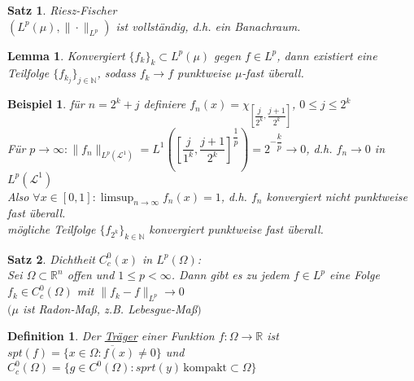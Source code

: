\documentclass[11pt]{memoir}
\theoremstyle{changebreak}
\newtheorem{Definition}{Definition}[chapter]
\newtheorem{Beispiel}{Beispiel}[chapter]
\newtheorem{Lemma}{Lemma}[chapter]
\newtheorem{Satz}{Satz}[chapter]
\begin{document}




\begin{Satz}
\emph{Riesz-Fischer} \\
$\left(L^p(\mu), \|\cdotp\|_{L^p}\right)$ ist vollständig, d.h. ein Banachraum.
\end{Satz}

\begin{Lemma}
Konvergiert $\{f_k\}_k \subset L^p (\mu)$ gegen $f \in L^p$, dann existiert eine Teilfolge $\{f_{k_j}\}_{j \in \mathbb N}$, sodass $f_k \rightarrow f$ punktweise $\mu$-fast überall.
\end{Lemma}

\begin{Beispiel}
für $n = 2^k + j$ definiere $f_n(x) = \chi_{\left[\dfrac{j}{2^k}, \dfrac{j+1}{2^k}\right]}$, $0 \leq j \leq 2^k$ \\
Für $p \rightarrow \infty: \|f_n\|_{L^p(\mathscr L^1)} = L^1\left(\left[\dfrac{j}{1^k}, \dfrac{j+1}{2^k} \right] ^{\dfrac{1}{p}} \right) = 2^{-\dfrac{k}{p}} \rightarrow 0$, d.h. $f_n \rightarrow 0$ in $L^p(\mathscr L^1)$ \\
Also $\forall x \in [0, 1]: \limsup_{n \rightarrow \infty} f_n (x) = 1$, d.h. $f_n$ konvergiert nicht punktweise fast überall. \\
mögliche Teilfolge $\{f_{2^k}\}_{k \in \mathbb N}$ konvergiert punktweise fast überall.
\end{Beispiel}

\begin{Satz}
\emph{Dichtheit $C^0_c (x)$ in $L^p(\Omega)$}: \\
Sei $\Omega \subset \mathbb R^n$ offen und $1 \leq p < \infty$. Dann gibt es zu jedem $f \in L^p$ eine Folge $f_k \in C^0_c (\Omega)$ mit $\|f_k - f\|_{L^p} \rightarrow 0$\\
$(\mu$ ist Radon-Maß, z.B. Lebesgue-Maß$)$
\end{Satz}

\begin{Definition}
Der \underline{Träger} einer Funktion $f: \Omega \rightarrow \mathbb R$ ist $spt(f) = \overline{\{x \in \Omega: f(x) \ne 0\}} $
und $C_c^0 (\Omega) = \{g \in C^0(\Omega): sprt(y) \, \text{kompakt} \subset \Omega\}$
\end{Definition}
\end{document}
